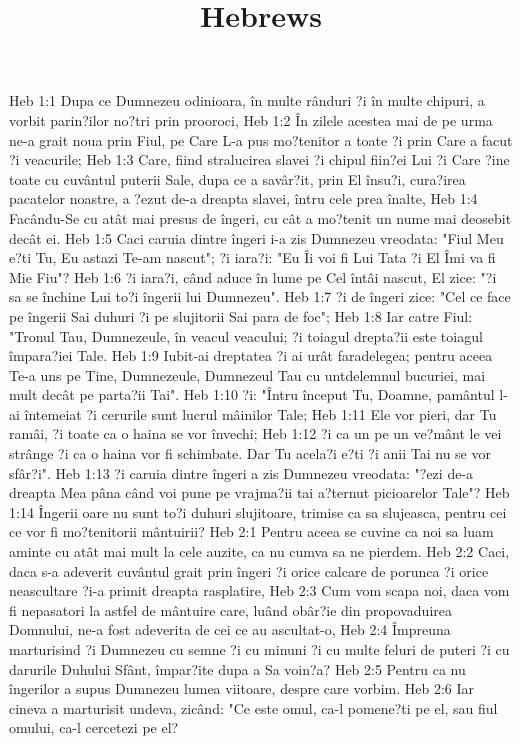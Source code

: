 

\title{Hebrews}

Heb 1:1  Dupa ce Dumnezeu odinioara, în multe rânduri ?i în multe chipuri, a vorbit parin?ilor no?tri prin prooroci,
Heb 1:2  În zilele acestea mai de pe urma ne-a grait noua prin Fiul, pe Care L-a pus mo?tenitor a toate ?i prin Care a facut ?i veacurile;
Heb 1:3  Care, fiind stralucirea slavei ?i chipul fiin?ei Lui ?i Care ?ine toate cu cuvântul puterii Sale, dupa ce a savâr?it, prin El însu?i, cura?irea pacatelor noastre, a ?ezut de-a dreapta slavei, întru cele prea înalte,
Heb 1:4  Facându-Se cu atât mai presus de îngeri, cu cât a mo?tenit un nume mai deosebit decât ei.
Heb 1:5  Caci caruia dintre îngeri i-a zis Dumnezeu vreodata: "Fiul Meu e?ti Tu, Eu astazi Te-am nascut"; ?i iara?i: "Eu Îi voi fi Lui Tata ?i El Îmi va fi Mie Fiu"?
Heb 1:6  ?i iara?i, când aduce în lume pe Cel întâi nascut, El zice: "?i sa se închine Lui to?i îngerii lui Dumnezeu".
Heb 1:7  ?i de îngeri zice: "Cel ce face pe îngerii Sai duhuri ?i pe slujitorii Sai para de foc";
Heb 1:8  Iar catre Fiul: "Tronul Tau, Dumnezeule, în veacul veacului; ?i toiagul drepta?ii este toiagul împara?iei Tale.
Heb 1:9  Iubit-ai dreptatea ?i ai urât faradelegea; pentru aceea Te-a uns pe Tine, Dumnezeule, Dumnezeul Tau cu untdelemnul bucuriei, mai mult decât pe parta?ii Tai".
Heb 1:10  ?i: "Întru început Tu, Doamne, pamântul l-ai întemeiat ?i cerurile sunt lucrul mâinilor Tale;
Heb 1:11  Ele vor pieri, dar Tu ramâi, ?i toate ca o haina se vor învechi;
Heb 1:12  ?i ca un pe un ve?mânt le vei strânge ?i ca o haina vor fi schimbate. Dar Tu acela?i e?ti ?i anii Tai nu se vor sfâr?i".
Heb 1:13  ?i caruia dintre îngeri a zis Dumnezeu vreodata: "?ezi de-a dreapta Mea pâna când voi pune pe vrajma?ii tai a?ternut picioarelor Tale"?
Heb 1:14  Îngerii oare nu sunt to?i duhuri slujitoare, trimise ca sa slujeasca, pentru cei ce vor fi mo?tenitorii mântuirii?
Heb 2:1  Pentru aceea se cuvine ca noi sa luam aminte cu atât mai mult la cele auzite, ca nu cumva sa ne pierdem.
Heb 2:2  Caci, daca s-a adeverit cuvântul grait prin îngeri ?i orice calcare de porunca ?i orice neascultare ?i-a primit dreapta rasplatire,
Heb 2:3  Cum vom scapa noi, daca vom fi nepasatori la astfel de mântuire care, luând obâr?ie din propovaduirea Domnului, ne-a fost adeverita de cei ce au ascultat-o,
Heb 2:4  Împreuna marturisind ?i Dumnezeu cu semne ?i cu minuni ?i cu multe feluri de puteri ?i cu darurile Duhului Sfânt, împar?ite dupa a Sa voin?a?
Heb 2:5  Pentru ca nu îngerilor a supus Dumnezeu lumea viitoare, despre care vorbim.
Heb 2:6  Iar cineva a marturisit undeva, zicând: "Ce este omul, ca-l pomene?ti pe el, sau fiul omului, ca-l cercetezi pe el?
